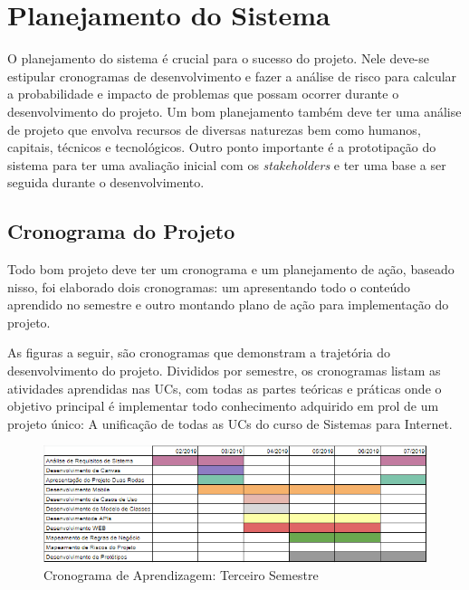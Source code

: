 \chapter{Planejamento do Sistema}

O planejamento do sistema é crucial para o sucesso do projeto. Nele deve-se estipular cronogramas de desenvolvimento e fazer a análise de risco para calcular a probabilidade e impacto de problemas que possam ocorrer durante o desenvolvimento do projeto.
Um bom planejamento também deve ter uma análise de projeto que envolva recursos de diversas naturezas bem como humanos, capitais, técnicos e tecnológicos.
Outro ponto importante é a prototipação do sistema para ter uma avaliação inicial com os \textit{stakeholders} e ter uma base a ser seguida durante o desenvolvimento.

\section{Cronograma do Projeto}

Todo bom projeto deve ter um cronograma e um planejamento de ação, baseado nisso, foi elaborado dois cronogramas: um apresentando todo o conteúdo aprendido no semestre e outro montando plano de ação para implementação do projeto.

As figuras a seguir, são cronogramas que demonstram a trajetória do desenvolvimento do projeto. Divididos por semestre, os cronogramas listam as atividades aprendidas nas UCs, com todas as partes teóricas e práticas onde o objetivo principal é implementar todo conhecimento adquirido em prol de um projeto único: A unificação de todas as UCs do curso de Sistemas para Internet.

\begin{figure}[H]
\caption{\label{cron-3-semestre}Cronograma de Aprendizagem: Terceiro Semestre}
\begin{center}
	\includegraphics[scale=0.90]{./Figuras/cronograma-3-semestre.png}
\end{center}
\end{figure}


